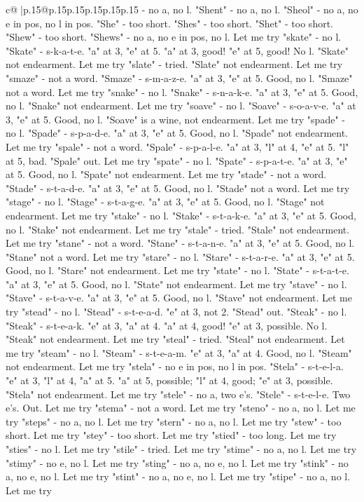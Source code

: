 \documentclass{article}
\begin{document}
{\begin{supertabular}{c@{$\;$}|p{.15\linewidth}@{}p{.15\linewidth}p{.15\linewidth}p{.15\linewidth}p{.15\linewidth}p{.15\linewidth}}
{{{{-} no a, no l. "Shent" {-} no a, no l. "Sheol" {-} no a, no e in pos, no l in pos. "She" {-} too short. "Shes" {-} too short. "Shet" {-} too short. "Shew" {-} too short. "Shews" {-} no a, no e in pos, no l. Let me try "skate" {-} no l. "Skate" {-} s{-}k{-}a{-}t{-}e. "a" at 3, "e" at 5. "a" at 3, good! "e" at 5, good! No l. "Skate" not endearment. Let me try "slate" {-} tried. "Slate" not endearment. Let me try "smaze" {-} not a word. "Smaze" {-} s{-}m{-}a{-}z{-}e. "a" at 3, "e" at 5. Good, no l. "Smaze" not a word. Let me try "snake" {-} no l. "Snake" {-} s{-}n{-}a{-}k{-}e. "a" at 3, "e" at 5. Good, no l. "Snake" not endearment. Let me try "soave" {-} no l. "Soave" {-} s{-}o{-}a{-}v{-}e. "a" at 3, "e" at 5. Good, no l. "Soave" is a wine, not endearment. Let me try "spade" {-} no l. "Spade" {-} s{-}p{-}a{-}d{-}e. "a" at 3, "e" at 5. Good, no l. "Spade" not endearment. Let me try "spale" {-} not a word. "Spale" {-} s{-}p{-}a{-}l{-}e. "a" at 3, "l" at 4, "e" at 5. "l" at 5, bad. "Spale" out. Let me try "spate" {-} no l. "Spate" {-} s{-}p{-}a{-}t{-}e. "a" at 3, "e" at 5. Good, no l. "Spate" not endearment. Let me try "stade" {-} not a word. "Stade" {-} s{-}t{-}a{-}d{-}e. "a" at 3, "e" at 5. Good, no l. "Stade" not a word. Let me try "stage" {-} no l. "Stage" {-} s{-}t{-}a{-}g{-}e. "a" at 3, "e" at 5. Good, no l. "Stage" not endearment. Let me try "stake" {-} no l. "Stake" {-} s{-}t{-}a{-}k{-}e. "a" at 3, "e" at 5. Good, no l. "Stake" not endearment. Let me try "stale" {-} tried. "Stale" not endearment. Let me try "stane" {-} not a word. "Stane" {-} s{-}t{-}a{-}n{-}e. "a" at 3, "e" at 5. Good, no l. "Stane" not a word. Let me try "stare" {-} no l. "Stare" {-} s{-}t{-}a{-}r{-}e. "a" at 3, "e" at 5. Good, no l. "Stare" not endearment. Let me try "state" {-} no l. "State" {-} s{-}t{-}a{-}t{-}e. "a" at 3, "e" at 5. Good, no l. "State" not endearment. Let me try "stave" {-} no l. "Stave" {-} s{-}t{-}a{-}v{-}e. "a" at 3, "e" at 5. Good, no l. "Stave" not endearment. Let me try "stead" {-} no l. "Stead" {-} s{-}t{-}e{-}a{-}d. "e" at 3, not 2. "Stead" out. "Steak" {-} no l. "Steak" {-} s{-}t{-}e{-}a{-}k. "e" at 3, "a" at 4. "a" at 4, good! "e" at 3, possible. No l. "Steak" not endearment. Let me try "steal" {-} tried. "Steal" not endearment. Let me try "steam" {-} no l. "Steam" {-} s{-}t{-}e{-}a{-}m. "e" at 3, "a" at 4. Good, no l. "Steam" not endearment. Let me try "stela" {-} no e in pos, no l in pos. "Stela" {-} s{-}t{-}e{-}l{-}a. "e" at 3, "l" at 4, "a" at 5. "a" at 5, possible; "l" at 4, good; "e" at 3, possible. "Stela" not endearment. Let me try "stele" {-} no a, two e's. "Stele" {-} s{-}t{-}e{-}l{-}e. Two e's. Out. Let me try "stema" {-} not a word. Let me try "steno" {-} no a, no l. Let me try "steps" {-} no a, no l. Let me try "stern" {-} no a, no l. Let me try "stew" {-} too short. Let me try "stey" {-} too short. Let me try "stied" {-} too long. Let me try "sties" {-} no l. Let me try "stile" {-} tried. Let me try "stime" {-} no a, no l. Let me try "stimy" {-} no e, no l. Let me try "sting" {-} no a, no e, no l. Let me try "stink" {-} no a, no e, no l. Let me try "stint" {-} no a, no e, no l. Let me try "stipe" {-} no a, no l. Let me try }}}
\end{supertabular}}
\end{document}
